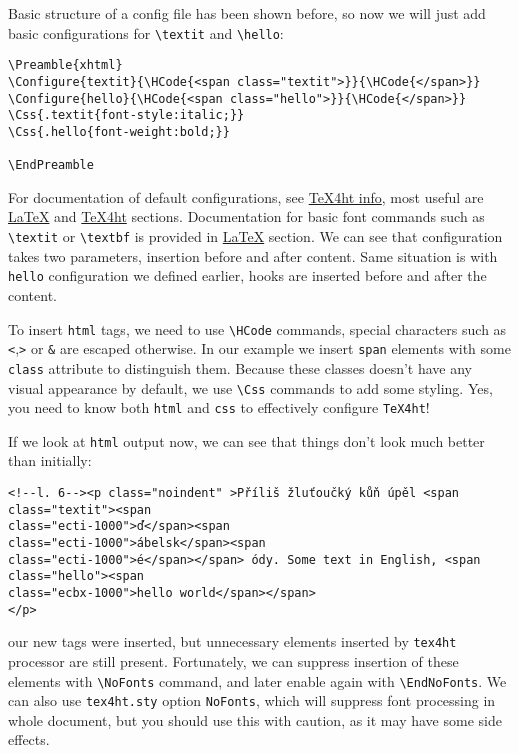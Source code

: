 Basic structure of a config file has been shown before, so now we will
just add basic configurations for \texttt{\textbackslash{}textit} and
\texttt{\textbackslash{}hello}:

\begin{verbatim}
\Preamble{xhtml}
\Configure{textit}{\HCode{<span class="textit">}}{\HCode{</span>}}
\Configure{hello}{\HCode{<span class="hello">}}{\HCode{</span>}}
\Css{.textit{font-style:italic;}}
\Css{.hello{font-weight:bold;}}

\EndPreamble
\end{verbatim}

For documentation of default configurations, see
\href{http://michal-h21.github.io/src4ht/tex4ht-info.html}{TeX4ht info},
most useful are
\href{http://michal-h21.github.io/src4ht/tex4ht-infose2.html}{LaTeX} and
\href{http://michal-h21.github.io/src4ht/tex4ht-infose1.html}{TeX4ht}
sections. Documentation for basic font commands such as
\texttt{\textbackslash{}textit} or \texttt{\textbackslash{}textbf} is
provided in
\href{http://michal-h21.github.io/src4ht/tex4ht-infose2.html}{LaTeX}
section. We can see that configuration takes two parameters, insertion
before and after content. Same situation is with \texttt{hello}
configuration we defined earlier, hooks are inserted before and after
the content.

To insert \texttt{html} tags, we need to use
\texttt{\textbackslash{}HCode} commands, special characters such as
\texttt{\textless{}},\texttt{\textgreater{}} or \texttt{\&} are escaped
otherwise. In our example we insert \texttt{span} elements with some
\texttt{class} attribute to distinguish them. Because these classes
doesn't have any visual appearance by default, we use
\texttt{\textbackslash{}Css} commands to add some styling. Yes, you need
to know both \texttt{html} and \texttt{css} to effectively configure
\texttt{TeX4ht}!

If we look at \texttt{html} output now, we can see that things don't
look much better than initially:

\begin{verbatim}
<!--l. 6--><p class="noindent" >Příliš žluťoučký kůň úpěl <span class="textit"><span 
class="ecti-1000">ď</span><span 
class="ecti-1000">ábelsk</span><span 
class="ecti-1000">é</span></span> ódy. Some text in English, <span class="hello"><span 
class="ecbx-1000">hello world</span></span>
</p> 
\end{verbatim}

our new tags were inserted, but unnecessary elements inserted by
\texttt{tex4ht} processor are still present. Fortunately, we can
suppress insertion of these elements with
\texttt{\textbackslash{}NoFonts} command, and later enable again with
\texttt{\textbackslash{}EndNoFonts}. We can also use \texttt{tex4ht.sty}
option \texttt{NoFonts}, which will suppress font processing in whole
document, but you should use this with caution, as it may have some side
effects.

